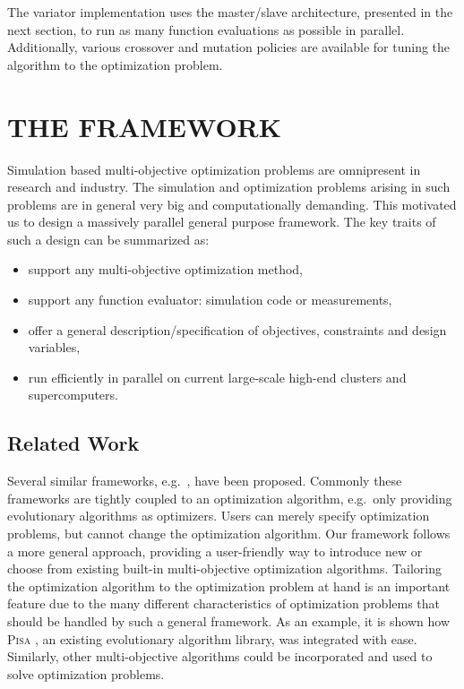 \documentclass[preprint,linenumbers,amsmath,amssymb,aps,prstab]{revtex4-1}%
\begin{document}
The variator implementation uses the master/slave architecture, presented in
  the next section, to run as many function evaluations as possible in parallel.
Additionally, various crossover and mutation policies are available for tuning
  the algorithm to the optimization problem.



\section{THE FRAMEWORK} \label{sec:framework}

Simulation based multi-objective optimization problems are omnipresent in
  research and industry.
The simulation and optimization problems arising in such problems are in
  general very big and computationally demanding.
This motivated us to design a massively parallel general purpose framework.
The key traits of such a design can be summarized as:
%
\begin{itemize}
  \item support any multi-objective optimization method,
  \item support any function evaluator: simulation code or measurements,
  \item offer a general description/specification of objectives, constraints
        and design variables,
  \item run efficiently in parallel on current large-scale high-end clusters
        and supercomputers.
\end{itemize}
%

\subsection{Related Work}

Several similar frameworks, e.g.~\cite{fide:09,lems:09,lbjt:07,dnld:06}, have
  been proposed.
Commonly these frameworks are tightly coupled to an optimization algorithm,
  e.g.\ only providing evolutionary algorithms as optimizers.
Users can merely specify optimization problems, but cannot change the
  optimization algorithm.
Our framework follows a more general approach, providing a user-friendly way
  to introduce new or choose from existing built-in multi-objective
  optimization algorithms.
Tailoring the optimization algorithm to the optimization problem at hand is
  an important feature due to the many different characteristics of
  optimization problems that should be handled by such a general framework.
As an example, it is shown how \textsc{Pisa} \cite{pisa}, an existing evolutionary
  algorithm library, was integrated with ease.
Similarly, other multi-objective algorithms could be incorporated and
  used to solve optimization problems.
\end{document}

